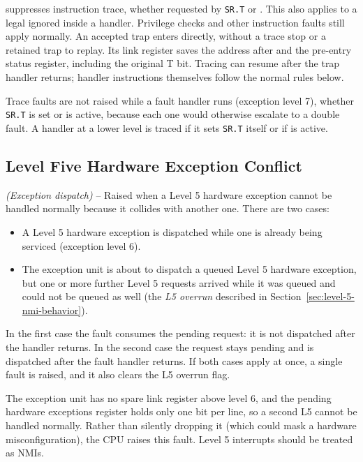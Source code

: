  suppresses instruction trace, whether requested by \texttt{SR.T} or .
This also applies to a legal  ignored inside a handler. Privilege checks and other instruction faults
still apply normally. An accepted trap enters directly, without a trace stop or a retained trap to replay. Its link
register saves the address after  and the pre-entry status register, including the original T bit.
Tracing can resume after the trap handler returns; handler instructions themselves follow the normal rules below.

Trace faults are not raised while a fault handler runs (exception level 7), whether \texttt{SR.T} is set or
 is active, because each one would otherwise escalate to a double fault. A handler at a lower level is
traced if it sets \texttt{SR.T} itself or if  is active.

\subsection{Level Five Hardware Exception Conflict}
\label{sec:level-five-conflict-fault}

\textit{(Exception dispatch)} -- Raised when a Level 5 hardware exception cannot be handled normally because it
collides with another one. There are two cases:

\begin{itemize}
	\item A Level 5 hardware exception is dispatched while one is already being serviced (exception level 6).
	\item The exception unit is about to dispatch a queued Level 5 hardware exception, but one or more further Level 5 requests
	      arrived while it was queued and could not be queued as well (the \emph{L5 overrun} described in
	      Section~\ref{sec:level-5-nmi-behavior}).
\end{itemize}

In the first case the fault consumes the pending request: it is not dispatched after the handler returns. In the second
case the request stays pending and is dispatched after the fault handler returns. If both cases apply at once, a single
fault is raised, and it also clears the L5 overrun flag.

The exception unit has no spare link register above level 6, and the pending hardware exceptions register holds only
one bit per line, so a second L5 cannot be handled normally. Rather than silently dropping it (which could mask a
hardware misconfiguration), the CPU raises this fault. Level 5 interrupts should be treated as NMIs.

